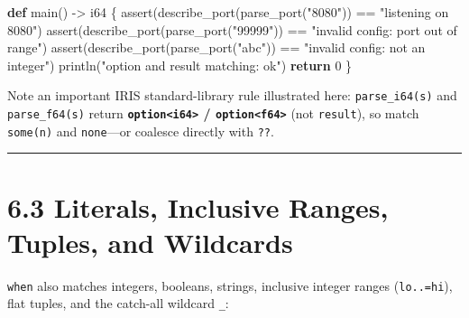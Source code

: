 \documentclass[
  english,
  oneside]{book}
\newenvironment{Shaded}{\begin{snugshade}}{\end{snugshade}}
\newcommand{\ControlFlowTok}[1]{\textcolor[rgb]{0.77,0.53,0.75}{\textbf{#1}}}
\newcommand{\DataTypeTok}[1]{\textcolor[rgb]{0.31,0.79,0.69}{#1}}
\newcommand{\DecValTok}[1]{\textcolor[rgb]{0.71,0.81,0.66}{#1}}
\newcommand{\FunctionTok}[1]{\textcolor[rgb]{0.86,0.86,0.67}{#1}}
\newcommand{\KeywordTok}[1]{\textcolor[rgb]{0.34,0.61,0.84}{\textbf{#1}}}
\newcommand{\NormalTok}[1]{\textcolor[rgb]{0.83,0.83,0.83}{#1}}
\newcommand{\OperatorTok}[1]{\textcolor[rgb]{0.83,0.83,0.83}{#1}}
\newcommand{\StringTok}[1]{\textcolor[rgb]{0.81,0.57,0.47}{#1}}
\newcounter{none} %
\begin{document}
\begin{Shaded}
\begin{Highlighting}[]
\KeywordTok{def}\NormalTok{ main() }\OperatorTok{{-}\textgreater{}} \DataTypeTok{i64}\NormalTok{ \{}
    \FunctionTok{assert}\NormalTok{(describe\_port(parse\_port(}\StringTok{"8080"}\NormalTok{)) }\OperatorTok{==} \StringTok{"listening on 8080"}\NormalTok{)}
    \FunctionTok{assert}\NormalTok{(describe\_port(parse\_port(}\StringTok{"99999"}\NormalTok{)) }\OperatorTok{==} \StringTok{"invalid config: port out of range"}\NormalTok{)}
    \FunctionTok{assert}\NormalTok{(describe\_port(parse\_port(}\StringTok{"abc"}\NormalTok{)) }\OperatorTok{==} \StringTok{"invalid config: not an integer"}\NormalTok{)}
\NormalTok{    println(}\StringTok{"option and result matching: ok"}\NormalTok{)}
    \ControlFlowTok{return} \DecValTok{0}
\NormalTok{\}}
\end{Highlighting}
\end{Shaded}

Note an important IRIS standard-library rule illustrated here:
\texttt{parse\_i64(s)} and \texttt{parse\_f64(s)} return
\textbf{\texttt{option\textless{}i64\textgreater{}} /
\texttt{option\textless{}f64\textgreater{}}} (not \texttt{result}), so
match \texttt{some(n)} and \texttt{none}---or coalesce directly with
\texttt{??}.

\begin{center}\rule{0.5\linewidth}{0.5pt}\end{center}

\section{6.3 Literals, Inclusive Ranges, Tuples, and
Wildcards}\label{literals-inclusive-ranges-tuples-and-wildcards}

\texttt{when} also matches integers, booleans, strings, inclusive
integer ranges (\texttt{lo..=hi}), flat tuples, and the catch-all
wildcard \texttt{\_}:
\end{document}
